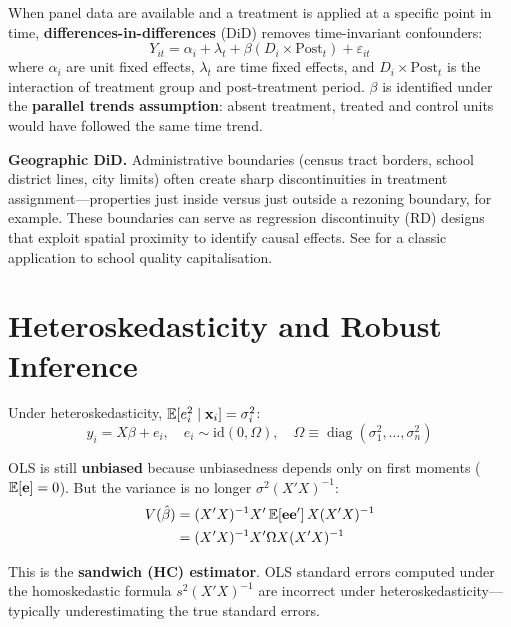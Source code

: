 When panel data are available and a treatment is applied at a specific point
in time, \textbf{differences-in-differences}
(DiD) removes time-invariant confounders:
\begin{equation}
  Y_{it} = \alpha_i + \lambda_t + \beta(D_i \times \text{Post}_t) + \varepsilon_{it}
\end{equation}
where $\alpha_i$ are unit fixed effects, $\lambda_t$ are time fixed effects,
and $D_i \times \text{Post}_t$ is the interaction of treatment group and
post-treatment period. $\beta$ is identified under the
\textbf{parallel trends assumption}: absent treatment, treated and control
units would have followed the same time trend.

\noindent\textbf{Geographic DiD.} Administrative boundaries (census tract
borders, school district lines, city limits) often create sharp discontinuities
in treatment assignment---properties just inside versus just outside a
rezoning boundary, for example. These boundaries can serve as regression
discontinuity (RD) designs that exploit spatial proximity to identify causal
effects. See \citet{Black1999} for a classic application to school quality
capitalisation.



\section{Heteroskedasticity and Robust Inference}
\label{sec_Heterosk}

Under heteroskedasticity, $\mathbb{E}[e_i^2\mid\mathbf{x}_i] = \sigma_i^2$:
\begin{equation}
  y_i = X\beta + e_i, \quad
  e_i \sim \text{id}(0, \Omega), \quad
  \Omega \equiv \operatorname{diag}(\sigma_1^2,\ldots,\sigma_n^2)
\end{equation}

OLS is still \textbf{unbiased} because unbiasedness depends only on first
moments ($\mathbb{E}[\mathbf{e}]=0$). But the variance is no longer $\sigma^2(X'X)^{-1}$:
\begin{align}
  V(\hat\beta)
  &= (X'X)^{-1}X'\,\mathbb{E}[\mathbf{e}\mathbf{e}']\,X(X'X)^{-1} \nonumber \\
  &= (X'X)^{-1}X'\Omega X(X'X)^{-1}
  \label{eq_SandwichVar}
\end{align}

This is the \textbf{sandwich (HC) estimator}. OLS
standard errors computed under the homoskedastic formula $s^2(X'X)^{-1}$ are
incorrect under heteroskedasticity---typically underestimating the true
standard errors.

